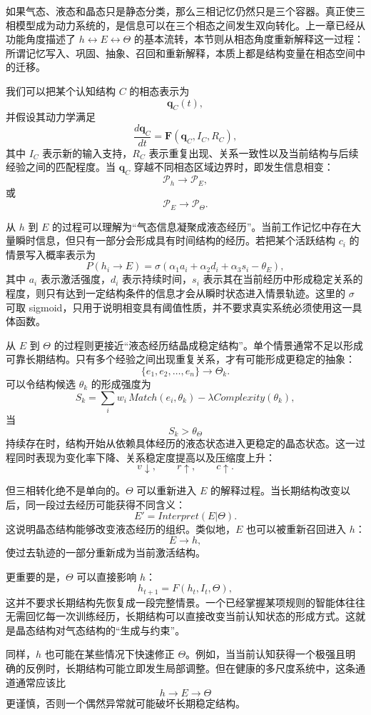 如果气态、液态和晶态只是静态分类，那么三相记忆仍然只是三个容器。真正使三相模型成为动力系统的，是信息可以在三个相态之间发生双向转化。上一章已经从功能角度描述了 $h\leftrightarrow E\leftrightarrow\Theta$ 的基本流转，本节则从相态角度重新解释这一过程：所谓记忆写入、巩固、抽象、召回和重新解释，本质上都是结构变量在相态空间中的迁移。

我们可以把某个认知结构 $C$ 的相态表示为
\[
\mathbf q_C(t),
\]
并假设其动力学满足
\[
\frac{d\mathbf q_C}{dt}
=
\mathbf F
\left(
\mathbf q_C,
I_C,
R_C
\right),
\]
其中 $I_C$ 表示新的输入支持，$R_C$ 表示重复出现、关系一致性以及当前结构与后续经验之间的匹配程度。当 $\mathbf q_C$ 穿越不同相态区域边界时，即发生信息相变：
\[
\mathcal P_h
\rightarrow
\mathcal P_E,
\]
或
\[
\mathcal P_E
\rightarrow
\mathcal P_\Theta.
\]

从 $h$ 到 $E$ 的过程可以理解为“气态信息凝聚成液态经历”。当前工作记忆中存在大量瞬时信息，但只有一部分会形成具有时间结构的经历。若把某个活跃结构 $c_i$ 的情景写入概率表示为
\[
P(h_i\rightarrow E)
=
\sigma
\left(
\alpha_1 a_i+
\alpha_2 d_i+
\alpha_3 s_i
-\theta_E
\right),
\]
其中 $a_i$ 表示激活强度，$d_i$ 表示持续时间，$s_i$ 表示其在当前经历中形成稳定关系的程度，则只有达到一定结构条件的信息才会从瞬时状态进入情景轨迹。这里的 $\sigma$ 可取 sigmoid，只用于说明相变具有阈值性质，并不要求真实系统必须使用这一具体函数。

从 $E$ 到 $\Theta$ 的过程则更接近“液态经历结晶成稳定结构”。单个情景通常不足以形成可靠长期结构。只有多个经验之间出现重复关系，才有可能形成更稳定的抽象：
\[
\{e_1,e_2,\ldots,e_n\}
\rightarrow
\Theta_k.
\]
可以令结构候选 $\theta_k$ 的形成强度为
\[
S_k
=
\sum_i
w_i
\,Match(e_i,\theta_k)
-
\lambda Complexity(\theta_k),
\]
当
\[
S_k>\theta_\Theta
\]
持续存在时，结构开始从依赖具体经历的液态状态进入更稳定的晶态状态。这一过程同时表现为变化率下降、关系稳定度提高以及压缩度上升：
\[
v\downarrow,\qquad
r\uparrow,\qquad
c\uparrow.
\]

但三相转化绝不是单向的。$\Theta$ 可以重新进入 $E$ 的解释过程。当长期结构改变以后，同一段过去经历可能获得不同含义：
\[
E'
=
Interpret(E|\Theta).
\]
这说明晶态结构能够改变液态经历的组织。类似地，$E$ 也可以被重新召回进入 $h$：
\[
E
\rightarrow
h,
\]
使过去轨迹的一部分重新成为当前激活结构。

更重要的是，$\Theta$ 可以直接影响 $h$：
\[
h_{t+1}
=
F(h_t,I_t,\Theta),
\]
这并不要求长期结构先恢复成一段完整情景。一个已经掌握某项规则的智能体往往无需回忆每一次训练经历，长期结构可以直接改变当前认知状态的形成方式。这就是晶态结构对气态结构的“生成与约束”。

同样，$h$ 也可能在某些情况下快速修正 $\Theta$。例如，当当前认知获得一个极强且明确的反例时，长期结构可能立即发生局部调整。但在健康的多尺度系统中，这条通道通常应该比
\[
h\rightarrow E\rightarrow\Theta
\]
更谨慎，否则一个偶然异常就可能破坏长期稳定结构。

